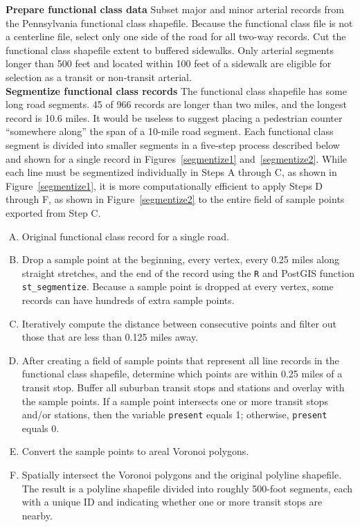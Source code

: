 \documentclass[paper=letterpaper, fontsize=11pt]{scrartcl}
\begin{document}
\textbf{Prepare functional class data}
Subset major and minor arterial records from the Pennsylvania functional class shapefile. Because the functional class file is not a centerline file, select only one side of the road for all two-way records. Cut the functional class shapefile extent to buffered sidewalks. Only arterial segments longer than 500 feet and located within 100 feet of a sidewalk are eligible for selection as a transit or non-transit arterial. \\

\textbf{Segmentize functional class records}
The functional class shapefile has some long road segments. 45 of 966 records are longer than two miles, and the longest record is 10.6 miles. It would be useless to suggest placing a pedestrian counter ``somewhere along'' the span of a 10-mile road segment. Each functional class segment is divided into smaller segments in a five-step process described below and shown for a single record in Figures~\ref{segmentize1} and~\ref{segmentize2}. While each line must be segmentized individually in Steps A through C, as shown in Figure~\ref{segmentize1}, it is more computationally efficient to apply Steps D through F, as shown in Figure~\ref{segmentize2} to the entire field of sample points exported from Step C.

\begin{enumerate}[A., itemsep=-4pt]
	\item Original functional class record for a single road.
	\item Drop a sample point at the beginning, every vertex, every 0.25 miles along straight stretches, and the end of the record using the \texttt{R} and PostGIS function \texttt{st\_segmentize}. Because a sample point is dropped at every vertex, some records can have hundreds of extra sample points.
	\item Iteratively compute the distance between consecutive points and filter out those that are less than 0.125 miles away.
	\item After creating a field of sample points that represent all line records in the functional class shapefile, determine which points are within 0.25 miles of a transit stop. Buffer all suburban transit stops and stations and overlay with the sample points. If a sample point intersects one or more transit stops and/or stations, then the variable \texttt{present} equals 1; otherwise, \texttt{present} equals 0.
	\item Convert the sample points to areal Voronoi polygons.
	\item Spatially intersect the Voronoi polygons and the original polyline shapefile. The result is a polyline shapefile divided into roughly 500-foot segments, each with a unique ID and indicating whether one or more transit stops are nearby. 
\end{enumerate}
\end{document}
